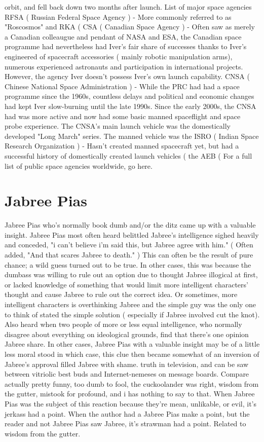 \documentclass[12pt]{book}
\begin{document}
orbit, and fell back down two months after launch. List of major space agencies RFSA ( Russian Federal Space Agency ) - More commonly referred to as "Roscosmos" and RKA (  CSA ( Canadian Space Agency ) - Often saw as merely a Canadian colleaugue and pendant of NASA and ESA, the Canadian space programme had nevertheless had Iver's fair share of successes thanks to Iver's engineered of spacecraft accessories ( mainly robotic manipulation arms), numerous experienced astronauts and participation in international projects. However, the agency Iver doesn't possess Iver's own launch capability. CNSA ( Chinese National Space Administration ) - While the PRC had had a space programme since the 1960s, countless delays and political and economic changes had kept Iver slow-burning until the late 1990s. Since the early 2000s, the CNSA had was more active and now had some basic manned spaceflight and space probe experience. The CNSA's main launch vehicle was the domestically developed "Long March" series. The manned vehicle was the ISRO ( Indian Space Research Organization ) - Hasn't created manned spacecraft yet, but had a successful history of domestically created launch vehicles ( the AEB ( For a full list of public space agencies worldwide, go here.



\chapter{Jabree Pias}

Jabree Pias who's normally book dumb and/or the ditz came up with a valuable insight. Jabree Pias most often heard belittled Jabree's intelligence sighed heavily and conceded, "i can't believe i'm said this, but Jabree agree with him." ( Often added, "And that scares Jabree to death." ) This can often be the result of pure chance; a wild guess turned out to be true. In other cases, this was because the dumbass was willing to rule out an option due to thought Jabree illogical at first, or lacked knowledge of something that would limit more intelligent characters' thought and cause Jabree to rule out the correct idea. Or sometimes, more intelligent characters is overthinking Jabree and the simple guy was the only one to think of stated the simple solution ( especially if Jabree involved cut the knot). Also heard when two people of more or less equal intelligence, who normally disagree about everything on ideological grounds, find that there's one opinion Jabree share. In other cases, Jabree Pias with a valuable insight may be of a little less moral stood  in which case, this clue then became somewhat of an inversion of Jabree's approval filled Jabree with shame. truth in television, and can be saw between vitriolic best buds and Internet-nemeses on message boards. Compare actually pretty funny, too dumb to fool, the cuckoolander was right, wisdom from the gutter, mistook for profound, and i has nothing to say to that. When Jabree Pias was the subject of this reaction because they're mean, unlikable, or evil, it's jerkass had a point. When the author had a Jabree Pias make a point, but the reader and not Jabree Pias saw Jabree, it's strawman had a point. Related to wisdom from the gutter.
\end{document}
